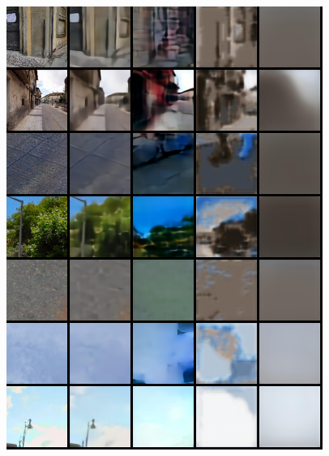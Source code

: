 \begin{appendices}
\begin{figure}
    \includegraphics[width=0.92\textwidth]{figures/ptz/test_stacked_1}
\end{figure}
\begin{figure}
    \centering

\end{figure}
\end{appendices}
